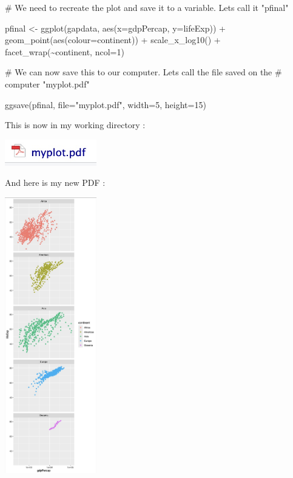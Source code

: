 \documentclass[
  letterpaper,
  DIV=11,
  numbers=noendperiod]{scrreprt}
\newenvironment{Shaded}{\begin{snugshade}}{\end{snugshade}}
\newcommand{\AttributeTok}[1]{\textcolor[rgb]{0.40,0.45,0.13}{#1}}
\newcommand{\CommentTok}[1]{\textcolor[rgb]{0.37,0.37,0.37}{#1}}
\newcommand{\DecValTok}[1]{\textcolor[rgb]{0.68,0.00,0.00}{#1}}
\newcommand{\FunctionTok}[1]{\textcolor[rgb]{0.28,0.35,0.67}{#1}}
\newcommand{\NormalTok}[1]{\textcolor[rgb]{0.00,0.23,0.31}{#1}}
\newcommand{\OtherTok}[1]{\textcolor[rgb]{0.00,0.23,0.31}{#1}}
\newcommand{\SpecialCharTok}[1]{\textcolor[rgb]{0.37,0.37,0.37}{#1}}
\newcommand{\StringTok}[1]{\textcolor[rgb]{0.13,0.47,0.30}{#1}}
\begin{document}
\begin{Shaded}
\begin{Highlighting}[]
\CommentTok{\# We need to recreate the plot and save it to a variable. Let\textquotesingle{}s call it "pfinal"}

\NormalTok{pfinal }\OtherTok{\textless{}{-}} \FunctionTok{ggplot}\NormalTok{(gapdata, }\FunctionTok{aes}\NormalTok{(}\AttributeTok{x=}\NormalTok{gdpPercap, }\AttributeTok{y=}\NormalTok{lifeExp)) }\SpecialCharTok{+}
          \FunctionTok{geom\_point}\NormalTok{(}\FunctionTok{aes}\NormalTok{(}\AttributeTok{colour=}\NormalTok{continent)) }\SpecialCharTok{+}
          \FunctionTok{scale\_x\_log10}\NormalTok{() }\SpecialCharTok{+}
          \FunctionTok{facet\_wrap}\NormalTok{(}\SpecialCharTok{\textasciitilde{}}\NormalTok{continent, }\AttributeTok{ncol=}\DecValTok{1}\NormalTok{) }

\CommentTok{\# We can now save this to our computer. Let\textquotesingle{}s call the file saved on the }
\CommentTok{\# computer "myplot.pdf"}

\FunctionTok{ggsave}\NormalTok{(pfinal, }\AttributeTok{file=}\StringTok{"myplot.pdf"}\NormalTok{, }\AttributeTok{width=}\DecValTok{5}\NormalTok{, }\AttributeTok{height=}\DecValTok{15}\NormalTok{)}
\end{Highlighting}
\end{Shaded}

This is now in my working directory :

\includegraphics[width=0.3\textwidth,height=\textheight]{./images/AST_4.jpg}

And here is my new PDF :

\includegraphics[width=0.3\textwidth,height=\textheight]{./images/AST_5.jpg}
\end{document}
